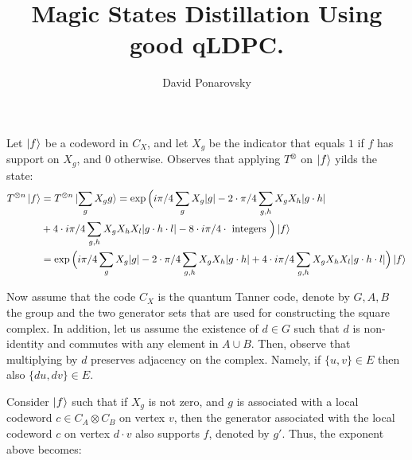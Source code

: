 \documentclass[manuscript,screen,review]{acmart}
\begin{document}

\title{Magic States Distillation  Using good qLDPC.} 
\author{David Ponarovsky}
\maketitle

%

Let $\ket{f}$ be a codeword in $C_{X}$, and let $X_{g}$ be the indicator that equals $1$ if $f$ has support on $X_{g}$, and $0$ otherwise. Observes that applying $T^{\otimes}$ on $\ket{f}$ yilds the state: 
\begin{equation*}
  \begin{split}
    T^{\otimes n}\ket{f} & =  T^{\otimes n}\ket{\sum_{g} X_{g}g } = \exp \Big( i\pi/4 \sum_{g} X_{g}|g|  -  2 \cdot \pi/4 \sum_{g,h} X_{g}X_{h}|g\cdot h| \\
    & +  4 \cdot i\pi/4 \sum_{g,h} X_{g}X_{h}X_{l}|g\cdot h \cdot l| -   8  \cdot i\pi/4 \cdot \text{ integers } \Big) \ket{f} \\
    & = \exp \Big( i\pi/4 \sum_{g} X_{g}|g|  -  2 \cdot \pi/4 \sum_{g,h} X_{g}X_{h}|g\cdot h| +  4 \cdot i\pi/4 \sum_{g,h} X_{g}X_{h}X_{l}|g\cdot h \cdot l| \Big) \ket{f}
  \end{split}
\end{equation*}

Now assume that the code $C_{X}$ is the quantum Tanner code, denote by $G,A,B$ the group and the two generator sets that are used for constructing the square complex. In addition, let us assume the existence of $d \in G$ such that $d$ is non-identity and commutes with any element in $A \cup B$. Then, observe that multiplying by $d$ preserves adjacency on the complex. Namely, if $\{u,v\} \in E$ then also $\{du, dv\} \in E$. 

Consider $\ket{f}$ such that if $X_g$ is not zero, and $g$ is associated with a local codeword $c \in C_A \otimes C_B$ on vertex $v$, then the generator associated with the local codeword $c$ on vertex $d \cdot v$ also supports $f$, denoted by $g'$. Thus, the exponent above becomes:
\end{document}
